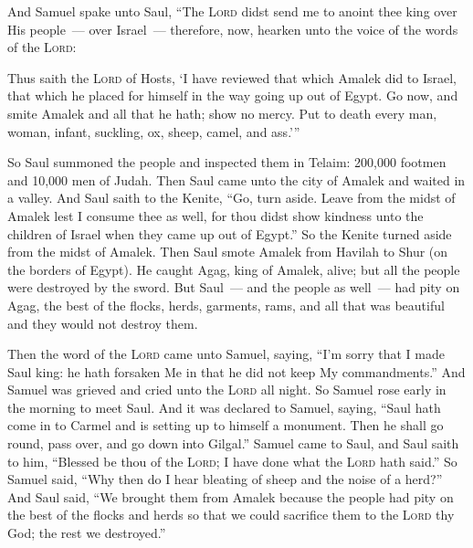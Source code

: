 
\begin{inparaenum}
     And Samuel spake unto Saul, ``The \textsc{Lord} didst send me to anoint thee king over His people~--- over Israel~--- therefore, now, hearken unto the voice of the words of the \textsc{Lord}:%
    
     Thus saith the \textsc{Lord} of Hosts, `I have reviewed that which Amalek did to Israel, that which he placed for himself in the way going up out of Egypt.%
     Go now, and smite Amalek and all that he hath; show no mercy. Put to death every man, woman, infant, suckling, ox, sheep, camel, and ass.'''%
    
     So Saul summoned the people and inspected them in Telaim: 200,000 footmen and 10,000 men of Judah.%
     Then Saul came unto the city of Amalek and waited in a valley.%
     And Saul saith to the Kenite, ``Go, turn aside. Leave from the midst of Amalek lest I consume thee as well, for thou didst show kindness unto the children of Israel when they came up out of Egypt.'' So the Kenite turned aside from the midst of Amalek.%
     Then Saul smote Amalek from Havilah to Shur (on the borders of Egypt).%
     He caught Agag, king of Amalek, alive; but all the people were destroyed by the sword.%
     But Saul~--- and the people as well~--- had pity on Agag, the best of the flocks, herds, garments, rams, and all that was beautiful and they would not destroy them.%
    
     Then the word of the \textsc{Lord} came unto Samuel, saying,%
     ``I'm sorry that I made Saul king: he hath forsaken Me in that he did not keep My commandments.'' And Samuel was grieved and cried unto the \textsc{Lord} all night.%
     So Samuel rose early in the morning to meet Saul. And it was declared to Samuel, saying, ``Saul hath come in to Carmel and is setting up to himself a monument. Then he shall go round, pass over, and go down into Gilgal.''%
     Samuel came to Saul, and Saul saith to him, ``Blessed be thou of the \textsc{Lord}; I have done what the \textsc{Lord} hath said.''%
     So Samuel said, ``Why then do I hear bleating of sheep and the noise of a herd?''%
     And Saul said, ``We brought them from Amalek because the people had pity on the best of the flocks and herds so that we could sacrifice them to the \textsc{Lord} thy God; the rest we destroyed.''%
    

\end{inparaenum}
